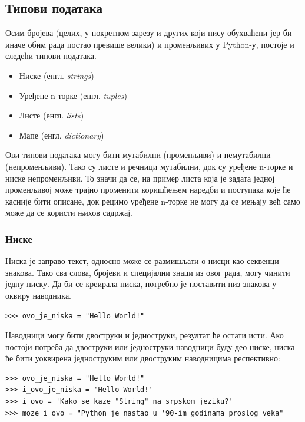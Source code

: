 \subsection{Типови података}

Осим бројева (целих, у покретном зарезу и других који нису обухваћени јер би иначе обим рада постао превише велики) и променљивих у Python-у, постоје и следећи типови података.

\begin{itemize}
\item Ниске (енгл. \emph{strings})
\item Уређене n-торке (енгл. \emph{tuples})
\item Листе (енгл. \emph{lists})
\item Мапе (енгл. \emph{dictionary})
\end{itemize}

Ови типови података могу бити мутабилни (променљиви) и немутабилни (непроменљиви). Тако су листе и речници мутабилни, док су уређене n-торке и ниске непроменљиви. То значи да се, на пример листа која је задата једној променљивој може трајно променити коришћењем наредби и поступака које ће касније бити описане, док рецимо уређене n-торке не могу да се мењају већ само може да се користи њихов садржај.

\subsubsection{Ниске}

Ниска је заправо текст, односно може се размишљати о нисци као секвенци знакова. Тако сва слова, бројеви и специјални знаци из овог рада, могу чинити једну ниску. Да би се креирала ниска, потребно је поставити низ знакова у оквиру наводника.

\begin{lstlisting}[caption = Креирање ниске, label = kreiranje_stringa]
>>> ovo_je_niska = "Hello World!"
\end{lstlisting}

Наводници могу бити двоструки и једноструки, резултат ће остати исти. Ако постоји потреба да двоструки или једноструки наводници буду део ниске, ниска ће бити уоквирена једноструким или двоструким наводницима респективно:

\begin{lstlisting}[caption = Примери креирања ниски, label = navodnici]
>>> ovo_je_niska = "Hello World!"
>>> i_ovo_je_niska = 'Hello World!'
>>> i_ovo = 'Kako se kaze "String" na srpskom jeziku?'
>>> moze_i_ovo = "Python je nastao u '90-im godinama proslog veka"
\end{lstlisting}


